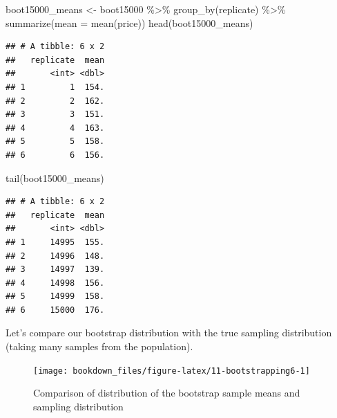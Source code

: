\documentclass[
]{krantz}
\makeatletter
\newenvironment{Shaded}{\begin{snugshade}}{\end{snugshade}}
\newcommand{\AttributeTok}[1]{\textcolor[rgb]{0.61,0.61,0.61}{#1}}
\newcommand{\FunctionTok}[1]{\textcolor[rgb]{0,0,0}{#1}}
\newcommand{\NormalTok}[1]{#1}
\newcommand{\OtherTok}[1]{\textcolor[rgb]{0.37,0.37,0.37}{#1}}
\newcommand{\SpecialCharTok}[1]{\textcolor[rgb]{0,0,0}{#1}}
\newcommand{\StringTok}[1]{\textcolor[rgb]{0.5,0.5,0.5}{#1}}
\newenvironment{kframe}{%
\medskip{}
\setlength{\fboxsep}{.8em}
 \def\at@end@of@kframe{}%
 \ifinner\ifhmode%
  \def\at@end@of@kframe{\end{minipage}}%
  \begin{minipage}{\columnwidth}%
 \fi\fi%
 \def\FrameCommand##1{\hskip\@totalleftmargin \hskip-\fboxsep
 \colorbox{shadecolor}{##1}\hskip-\fboxsep
     \hskip-\linewidth \hskip-\@totalleftmargin \hskip\columnwidth}%
 \MakeFramed {\advance\hsize-\width
   \@totalleftmargin\z@ \linewidth\hsize
   \@setminipage}}%
 {\par\unskip\endMakeFramed%
 \at@end@of@kframe}
\renewenvironment{Shaded}{\begin{kframe}}{\end{kframe}}
\makeatother
\begin{document}
\begin{Shaded}
\begin{Highlighting}[]
\NormalTok{boot15000\_means }\OtherTok{\textless{}{-}}\NormalTok{ boot15000 }\SpecialCharTok{\%\textgreater{}\%}
  \FunctionTok{group\_by}\NormalTok{(replicate) }\SpecialCharTok{\%\textgreater{}\%}
  \FunctionTok{summarize}\NormalTok{(}\AttributeTok{mean =} \FunctionTok{mean}\NormalTok{(price))}
\FunctionTok{head}\NormalTok{(boot15000\_means)}
\end{Highlighting}
\end{Shaded}

\begin{verbatim}
## # A tibble: 6 x 2
##   replicate  mean
##       <int> <dbl>
## 1         1  154.
## 2         2  162.
## 3         3  151.
## 4         4  163.
## 5         5  158.
## 6         6  156.
\end{verbatim}

\begin{Shaded}
\begin{Highlighting}[]
\FunctionTok{tail}\NormalTok{(boot15000\_means)}
\end{Highlighting}
\end{Shaded}

\begin{verbatim}
## # A tibble: 6 x 2
##   replicate  mean
##       <int> <dbl>
## 1     14995  155.
## 2     14996  148.
## 3     14997  139.
## 4     14998  156.
## 5     14999  158.
## 6     15000  176.
\end{verbatim}

\begin{Shaded}
\end{Shaded}

Let's compare our bootstrap distribution with the true sampling distribution (taking many samples from the population).

\begin{figure}
\texttt{[image: bookdown\_files/figure-latex/11-bootstrapping6-1]} \caption{Comparison of distribution of the bootstrap sample means and sampling distribution}\label{fig:11-bootstrapping6}
\end{figure}
\end{document}
